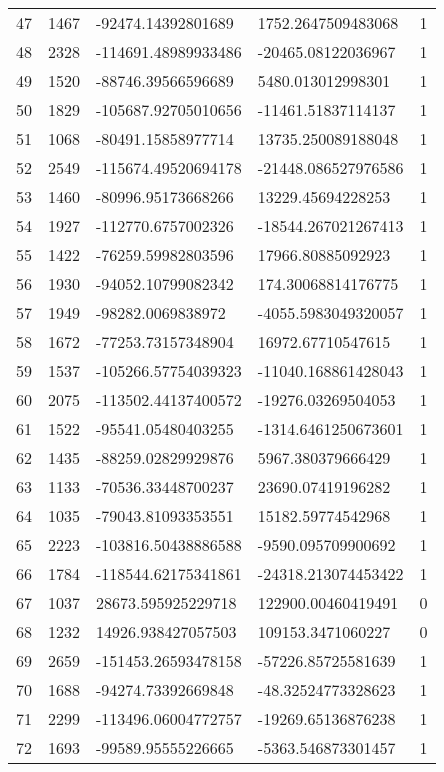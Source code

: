 \begin{longtable}{lllll}
    47 & 1467 & -92474.14392801689 & 1752.2647509483068 & 1 \\
    48 & 2328 & -114691.48989933486 & -20465.08122036967 & 1 \\
    49 & 1520 & -88746.39566596689 & 5480.013012998301 & 1 \\
    50 & 1829 & -105687.92705010656 & -11461.51837114137 & 1 \\
    51 & 1068 & -80491.15858977714 & 13735.250089188048 & 1 \\
    52 & 2549 & -115674.49520694178 & -21448.086527976586 & 1 \\
    53 & 1460 & -80996.95173668266 & 13229.45694228253 & 1 \\
    54 & 1927 & -112770.6757002326 & -18544.267021267413 & 1 \\
    55 & 1422 & -76259.59982803596 & 17966.80885092923 & 1 \\
    56 & 1930 & -94052.10799082342 & 174.30068814176775 & 1 \\
    57 & 1949 & -98282.0069838972 & -4055.5983049320057 & 1 \\
    58 & 1672 & -77253.73157348904 & 16972.67710547615 & 1 \\
    59 & 1537 & -105266.57754039323 & -11040.168861428043 & 1 \\
    60 & 2075 & -113502.44137400572 & -19276.03269504053 & 1 \\
    61 & 1522 & -95541.05480403255 & -1314.6461250673601 & 1 \\
    62 & 1435 & -88259.02829929876 & 5967.380379666429 & 1 \\
    63 & 1133 & -70536.33448700237 & 23690.07419196282 & 1 \\
    64 & 1035 & -79043.81093353551 & 15182.59774542968 & 1 \\
    65 & 2223 & -103816.50438886588 & -9590.095709900692 & 1 \\
    66 & 1784 & -118544.62175341861 & -24318.213074453422 & 1 \\
    67 & 1037 & 28673.595925229718 & 122900.00460419491 & 0 \\
    68 & 1232 & 14926.938427057503 & 109153.3471060227 & 0 \\
    69 & 2659 & -151453.26593478158 & -57226.85725581639 & 1 \\
    70 & 1688 & -94274.73392669848 & -48.32524773328623 & 1 \\
    71 & 2299 & -113496.06004772757 & -19269.65136876238 & 1 \\
    72 & 1693 & -99589.95555226665 & -5363.546873301457 & 1 \\

\end{longtable}
